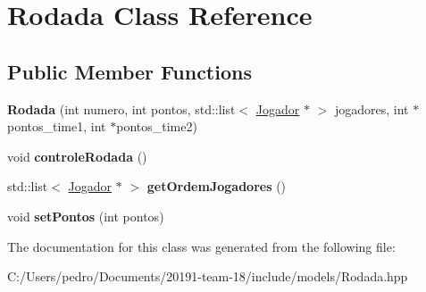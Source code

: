 \hypertarget{class_rodada}{}\section{Rodada Class Reference}
\label{class_rodada}
\subsection*{Public Member Functions}
\begin{DoxyCompactItemize}
\item 
\mbox{\label{class_rodada_a7cdc28bfebf93073496ce43656d67c9b}} 
{\bfseries Rodada} (int numero, int pontos, std\+::list$<$ \mbox{\hyperlink{class_jogador}{Jogador}} $\ast$ $>$ jogadores, int $\ast$pontos\+\_\+time1, int $\ast$pontos\+\_\+time2)
\item 
\mbox{\label{class_rodada_a664981d79cf62da514b0baaf640fb08c}} 
void {\bfseries controle\+Rodada} ()
\item 
\mbox{\label{class_rodada_a16bd9d4537bd55fe5ca1fd1e7dc9659f}} 
std\+::list$<$ \mbox{\hyperlink{class_jogador}{Jogador}} $\ast$ $>$ {\bfseries get\+Ordem\+Jogadores} ()
\item 
\mbox{\label{class_rodada_aa8ca4b5f5b62991292a33188a1004fd1}} 
void {\bfseries set\+Pontos} (int pontos)
\end{DoxyCompactItemize}


The documentation for this class was generated from the following file\+:\begin{DoxyCompactItemize}
\item 
C\+:/\+Users/pedro/\+Documents/20191-\/team-\/18/include/models/Rodada.\+hpp\end{DoxyCompactItemize}
